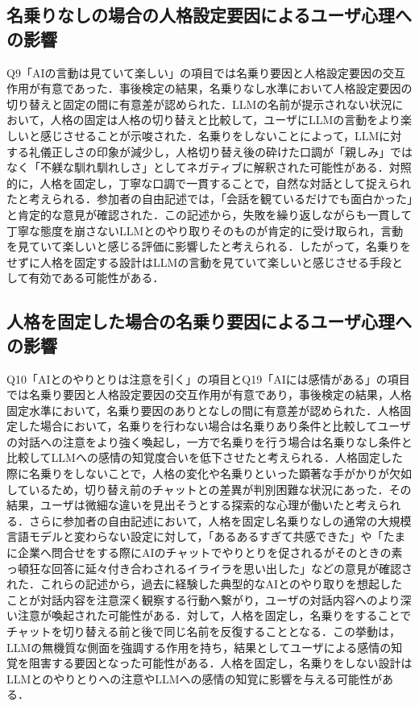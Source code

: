 \documentclass[10pt,twocolumn]{jsarticle}
\begin{document}
\subsection{名乗りなしの場合の人格設定要因によるユーザ心理への影響}
Q9「AIの言動は見ていて楽しい」の項目では名乗り要因と人格設定要因の交互作用が有意であった．事後検定の結果，名乗りなし水準において人格設定要因の切り替えと固定の間に有意差が認められた．LLMの名前が提示されない状況において，人格の固定は人格の切り替えと比較して，ユーザにLLMの言動をより楽しいと感じさせることが示唆された．名乗りをしないことによって，LLMに対する礼儀正しさの印象が減少し，人格切り替え後の砕けた口調が「親しみ」ではなく「不躾な馴れ馴れしさ」としてネガティブに解釈された可能性がある．対照的に，人格を固定し，丁寧な口調で一貫することで，自然な対話として捉えられたと考えられる．参加者の自由記述では，「会話を観ているだけでも面白かった」と肯定的な意見が確認された．この記述から，失敗を繰り返しながらも一貫して丁寧な態度を崩さないLLMとのやり取りそのものが肯定的に受け取られ，言動を見ていて楽しいと感じる評価に影響したと考えられる．したがって，名乗りをせずに人格を固定する設計はLLMの言動を見ていて楽しいと感じさせる手段として有効である可能性がある．

\subsection{人格を固定した場合の名乗り要因によるユーザ心理への影響}
 Q10「AIとのやりとりは注意を引く」の項目とQ19「AIには感情がある」の項目では名乗り要因と人格設定要因の交互作用が有意であり，事後検定の結果，人格固定水準において，名乗り要因のありとなしの間に有意差が認められた．人格固定した場合において，名乗りを行わない場合は名乗りあり条件と比較してユーザの対話への注意をより強く喚起し，一方で名乗りを行う場合は名乗りなし条件と比較してLLMへの感情の知覚度合いを低下させたと考えられる．人格固定した際に名乗りをしないことで，人格の変化や名乗りといった顕著な手がかりが欠如しているため，切り替え前のチャットとの差異が判別困難な状況にあった．その結果，ユーザは微細な違いを見出そうとする探索的な心理が働いたと考えられる．さらに参加者の自由記述において，人格を固定し名乗りなしの通常の大規模言語モデルと変わらない設定に対して，「あるあるすぎて共感できた」や「たまに企業へ問合せをする際にAIのチャットでやりとりを促されるがそのときの素っ頓狂な回答に延々付き合わされるイライラを思い出した」などの意見が確認された．これらの記述から，過去に経験した典型的なAIとのやり取りを想起したことが対話内容を注意深く観察する行動へ繋がり，ユーザの対話内容へのより深い注意が喚起された可能性がある．対して，人格を固定し，名乗りをすることでチャットを切り替える前と後で同じ名前を反復することとなる．この挙動は，LLMの無機質な側面を強調する作用を持ち，結果としてユーザによる感情の知覚を阻害する要因となった可能性がある．人格を固定し，名乗りをしない設計はLLMとのやりとりへの注意やLLMへの感情の知覚に影響を与える可能性がある．
\end{document}
